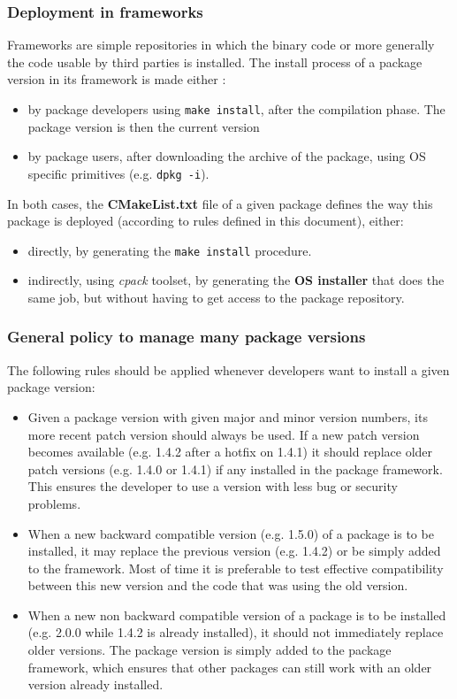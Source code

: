 \documentclass[12pt,a4paper]{article}
\begin{document}
\subsubsection{Deployment in frameworks}

Frameworks are simple repositories in which the binary code or more generally the code usable by third parties is installed. The install process of a package  version in its framework is made either :
\begin{itemize}
\item by package developers using \texttt{make install}, after the compilation phase. The package version is then the current version
\item by package users, after downloading the archive of the package, using OS specific primitives (e.g. \texttt{dpkg -i}).
\end{itemize}
In both cases, the \textbf{CMakeList.txt} file of a given package defines the way this package is deployed (according to rules defined in this document), either:
\begin{itemize}
\item directly, by generating the \texttt{make install} procedure.
\item indirectly, using \textit{cpack} toolset, by generating the \textbf{OS installer} that does the same job, but without having to get access to the package repository.
\end{itemize}


\subsubsection{General policy to manage many package versions}

The following rules should be applied whenever developers want to install a given package version:
\begin{itemize}
\item Given a package version with given major and minor version numbers, its more recent patch version should always be used. If a new patch version becomes available (e.g. 1.4.2 after a hotfix on 1.4.1) it should replace older patch versions (e.g. 1.4.0 or 1.4.1) if any installed in the package framework. This ensures the developer to use a version with less bug or security problems.
\item When a new backward compatible version (e.g. 1.5.0) of a package is to be installed, it may replace the previous version (e.g. 1.4.2) or be simply added to the framework. Most of time it is preferable to test effective compatibility between this new version and the code that was using the old version.
\item When a new non backward compatible version of a package is to be installed (e.g. 2.0.0 while 1.4.2 is already installed), it should not immediately replace older versions. The package version is simply added to the package framework, which ensures that other packages can still work with an older version already installed.
\end{itemize}
\end{document}
